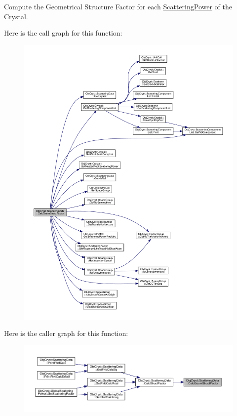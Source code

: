 Compute the \textquotesingle{}Geometrical Structure Factor\textquotesingle{} for each \mbox{\hyperlink{class_obj_cryst_1_1_scattering_power}{Scattering\+Power}} of the \mbox{\hyperlink{class_obj_cryst_1_1_crystal}{Crystal}}. 

Here is the call graph for this function\+:
\nopagebreak
\begin{figure}[H]
\begin{center}
\leavevmode
\includegraphics[width=350pt]{class_obj_cryst_1_1_scattering_data_a1b0237b27cf0e5a3fef7dba65113504e_cgraph}
\end{center}
\end{figure}
Here is the caller graph for this function\+:
\nopagebreak
\begin{figure}[H]
\begin{center}
\leavevmode
\includegraphics[width=350pt]{class_obj_cryst_1_1_scattering_data_a1b0237b27cf0e5a3fef7dba65113504e_icgraph}
\end{center}
\end{figure}
\mbox{\label{class_obj_cryst_1_1_scattering_data_a40e555c0ab59f92fda10dbe10cdee91b}} 
